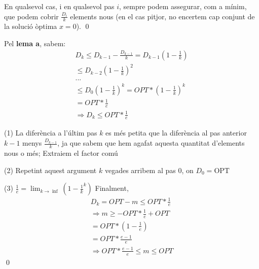 En qualsevol cas, i en qualsevol pas $i$, sempre podem assegurar, com a mínim, que podem cobrir $\frac{D_i}{k}$ elements nous (en el cas pitjor, no encertem cap conjunt de la solució òptima $x=0$).
\qed

Pel \textbf{lema a}, sabem:
\begin{eqnarray}
    D_k \leq D_{k-1}-\frac{D_{k-1}}{k} = D_{k-1}(1-\frac{1}{k})\\
    \leq D_{k-2}(1-\frac{1}{k})^2 \nonumber\\
    ... \nonumber \\
    \leq D_{0}(1-\frac{1}{k})^k = OPT*(1-\frac{1}{k})^k \\
    = OPT* \frac{1}{e} \\
    \Rightarrow D_k \leq OPT* \frac{1}{e} \nonumber
\end{eqnarray}
\par
(1) La diferència a l'últim pas $k$ es més petita que la diferència al pas anterior $k-1$ menys $\frac{D_{k-1}}{k}$, ja que sabem que hem agafat aquesta quantitat d'elements nous o més; Extraiem el factor comú
\newline
\par
(2) Repetint aquest argument $k$ vegades arribem al pas 0, on $D_0 = \text{OPT}$
\newline
\par
(3) $\frac{1}{e}=\lim_{k \longrightarrow \inf}(1-\frac{1}{k}^k)$
\newline
\newline
Finalment,
\begin{eqnarray}
    D_k = OPT - m \leq OPT*\frac{1}{e} \nonumber\\ 
    \Rightarrow m \geq -OPT*\frac{1}{e}+OPT \nonumber\\
    = OPT*(1-\frac{1}{e}) \nonumber\\
    = OPT*\frac{e-1}{e}  \nonumber\\
    \Rightarrow OPT*\frac{e-1}{e} \leq m \leq OPT \nonumber
\end{eqnarray}
\renewcommand\qedsymbol{$\blacksquare$}
\qed